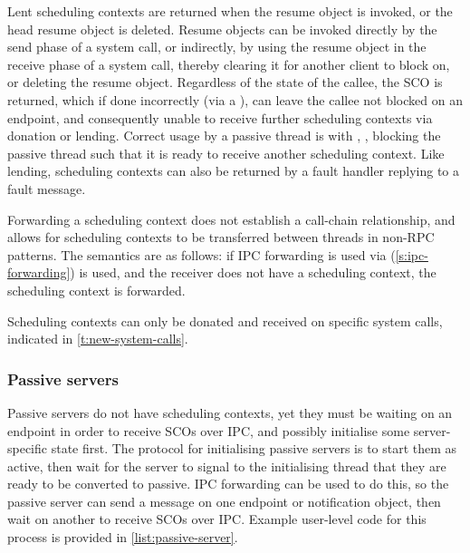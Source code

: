 Lent scheduling contexts are returned when the resume object is invoked, or the head resume object
is deleted. Resume objects 
can be invoked directly by the send phase of a system call, or indirectly, by using the
resume object in the receive phase of a system call, thereby clearing it for another client to block
on, or deleting the resume object.
Regardless of the state of the callee, the \gls{SCO} is returned, which if done
incorrectly (via a \send), can leave the callee not blocked on an endpoint, and consequently 
unable to receive further scheduling contexts via donation or lending. Correct usage by a passive thread is with \replyrecv,
\nbsendrecv, blocking the passive thread such that it is ready to receive another scheduling
context. Like lending, scheduling contexts can also be returned by a fault handler replying to a fault message.

Forwarding a scheduling context does not establish a call-chain relationship, and allows
for scheduling contexts to be transferred between threads in non-\gls{RPC} patterns. The semantics are
as follows: if \gls{IPC} forwarding is used via \nbsendrecv (\cref{s:ipc-forwarding}) is used, and the receiver does not have a scheduling context,
the scheduling context is forwarded. 

Scheduling contexts can only be donated and received on specific system calls, indicated in
\cref{t:new-system-calls}. 

\subsubsection{Passive servers}
\label{sec:impl-passive-servers}

Passive servers do not have scheduling contexts, yet they must be waiting on an endpoint in order to
receive \glspl{SCO} over \gls{IPC}, and possibly initialise some server-specific state first.
The protocol for initialising passive servers is to start them as
active, then wait for the server to signal to the initialising thread that they are ready to be
converted to passive. IPC forwarding can be used to do this, so the passive server can send a
message on one endpoint or notification object, then wait on another to receive \glspl{SCO} over
IPC. Example user-level code for this process is 
provided in \cref{list:passive-server}. 

